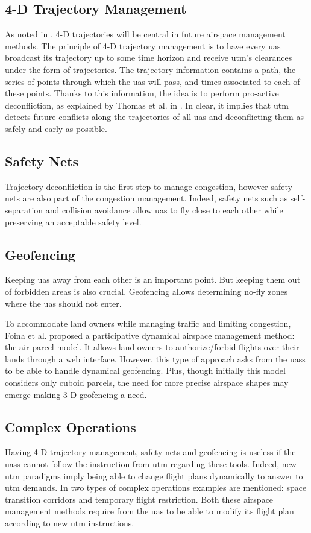 \subsection{4-D Trajectory Management}
As noted in \cite{erzberger_4D_2002}, 4-D trajectories will be central in future airspace 
management methods. The principle of 4-D trajectory management is to have every 
\gls{uas} broadcast its trajectory up to some time horizon and receive \gls{utm}'s 
clearances under the form of trajectories. The trajectory information contains a path, 
the series of points through which the \gls{uas} will pass, and times associated to each of these points. 
Thanks to this information, the idea is to perform pro-active deconfliction, as 
explained by Thomas et al. in \cite{thomas_4D_2015}. In clear, it implies that \gls{utm} 
detects future conflicts along the trajectories of all \gls{uas} and deconflicting them 
as safely and early as possible. 
				
\subsection{Safety Nets}
Trajectory deconfliction is the first step to manage congestion, however safety nets 
are also part of the congestion management. Indeed, safety nets such as self-separation 
and collision avoidance allow \gls{uas} to fly close to each other while preserving an 
acceptable safety level.
		
\subsection{Geofencing}
Keeping \gls{uas} away from each other is an important point. But keeping them 
out of forbidden areas is also crucial. Geofencing allows determining no-fly zones 
where the \gls{uas} should not enter.

To accommodate land owners while managing traffic and limiting congestion, Foina et al. 
\cite{foina_air_parcelle_2015} proposed a participative dynamical airspace management 
method: the air-parcel model. It allows land owners to authorize/forbid flights over their 
lands through a web interface. However, this type of approach asks from the \gls{uas}s 
to be able to handle dynamical geofencing. Plus, though initially this model considers only 
cuboid parcels, the need for more precise airspace shapes may emerge making 3-D geofencing a need.
	
\subsection{Complex Operations}
Having 4-D trajectory management, safety nets and geofencing is useless if the \gls{uas}s 
cannot follow the instruction from \gls{utm} regarding these tools. Indeed, new \gls{utm} 
paradigms imply being able to change flight plans dynamically to answer to \gls{utm} demands. 
In \cite{wargo_complex_2015} two types of complex operations examples are mentioned: 
space transition corridors and temporary flight restriction. Both these airspace management 
methods require from the \gls{uas} to be able to modify its flight plan according to new \gls{utm} instructions.
		

